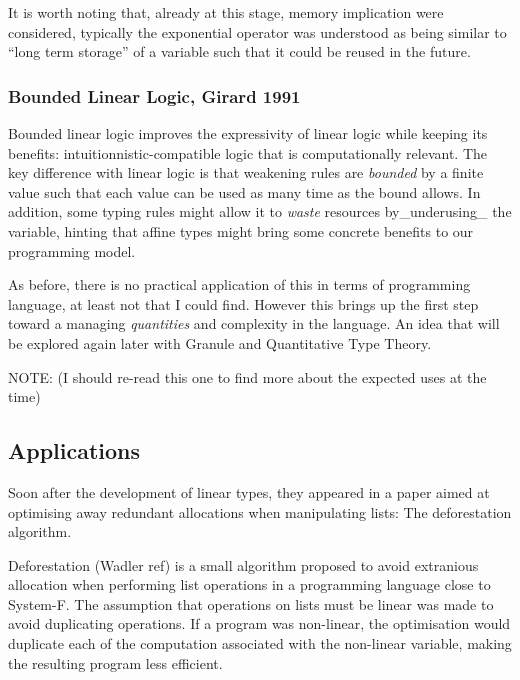 \documentclass[
]{article}
\begin{document}
It is worth noting that, already at this stage, memory implication were
considered, typically the exponential operator was understood as being
similar to ``long term storage'' of a variable such that it could be
reused in the future.

\hypertarget{bounded-linear-logic-girard-1991}{%
\subsubsection{Bounded Linear Logic, Girard
1991}\label{bounded-linear-logic-girard-1991}}

Bounded linear logic improves the expressivity of linear logic while
keeping its benefits: intuitionnistic-compatible logic that is
computationally relevant. The key difference with linear logic is that
weakening rules are \emph{bounded} by a finite value such that each
value can be used as many time as the bound allows. In addition, some
typing rules might allow it to \emph{waste} resources by\_underusing\_
the variable, hinting that affine types might bring some concrete
benefits to our programming model.

As before, there is no practical application of this in terms of
programming language, at least not that I could find. However this
brings up the first step toward a managing \emph{quantities} and
complexity in the language. An idea that will be explored again later
with Granule and Quantitative Type Theory.

NOTE: (I should re-read this one to find more about the expected uses at
the time)

\hypertarget{applications}{%
\subsection{Applications}\label{applications}}

Soon after the development of linear types, they appeared in a paper
aimed at optimising away redundant allocations when manipulating lists:
The deforestation algorithm.

Deforestation (Wadler ref) is a small algorithm proposed to avoid
extranious allocation when performing list operations in a programming
language close to System-F. The assumption that operations on lists must
be linear was made to avoid duplicating operations. If a program was
non-linear, the optimisation would duplicate each of the computation
associated with the non-linear variable, making the resulting program
less efficient.
\end{document}
